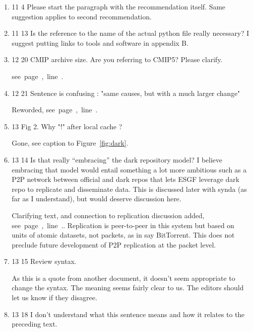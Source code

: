 \documentclass[gmd,manuscript]{copernicus}
\newcommand{\plref}[1]{\mbox{see page \pageref{p-#1}, line
    \lineref{l-#1}.}}
\newenvironment{answer}{\color{blue}}{}
\begin{document}
\begin{enumerate}[label=RC2-\arabic*,leftmargin=*]
  \begin{answer}
    List removed, \plref{RC2-21}
  \end{answer}
\item 11 4 Please start the paragraph with the recommendation itself.
  Same suggestion applies to second recommendation.
\item 11 13 Is the reference to the name of the actual python file
  really necessary? I suggest putting links to tools and software in
  appendix B.
\item 12 20 CMIP archive size. Are you referring to CMIP5? Please
  clarify.

  \begin{answer}
    \plref{RC1-28}
  \end{answer}
\item 12 21 Sentence is confusing : "same causes, but with a much
  larger change"

  \begin{answer}
    Reworded, \plref{RC1-29b}
  \end{answer}
\item 13 Fig 2. Why "!" after local cache ?

  \begin{answer}
    Gone, see caption to Figure~\ref{fig:dark}.
  \end{answer}
\item 13 14 Is that really ``embracing'' the dark repository model? I
  believe embracing that model would entail something a lot more
  ambitious such as a P2P network between official and dark repos that
  lets ESGF leverage dark repo to replicate and disseminate data. This
  is discussed later with synda (as far as I understand), but would
  deserve discussion here.

  \begin{answer}
    Clarifying text, and connection to replication discussion added,
    \plref{RC2-27}. Replication is peer-to-peer in this system but
    based on units of atomic datasets, not packets, as in say
    BitTorrent. This does not preclude future development of P2P
    replication at the packet level.
  \end{answer}
\item 13 15 Review syntax.

  \begin{answer}
    As this is a quote from another document, it doesn't seem
    appropriate to change the syntax. The meaning seems fairly clear
    to us. The editors should let us know if they disagree.
  \end{answer}
\item 13 18 I don’t understand what this sentence means and how it
  relates to the preceding text.


\end{enumerate}
\end{document}

